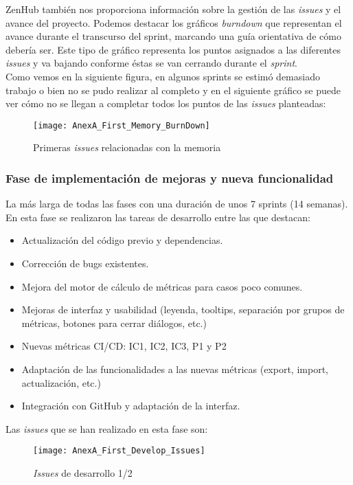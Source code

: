 ZenHub también nos proporciona información sobre la gestión de las \textit{issues} y el avance del proyecto. Podemos destacar los gráficos \textit{burndown} que representan el avance durante el transcurso del sprint, marcando una guía orientativa de cómo debería ser. Este tipo de gráfico representa los puntos asignados a las diferentes \textit{issues} y va bajando conforme éstas se van cerrando durante el \textit{sprint}. \\
Como vemos en la siguiente figura, en algunos sprints se estimó demasiado trabajo o bien no se pudo realizar al completo y en el siguiente gráfico se puede ver cómo no se llegan a completar todos los puntos de las \textit{issues} planteadas:

\begin{figure}[!h]
	\centering
	\texttt{[image: AnexA\_First\_Memory\_BurnDown]}
	\caption{Primeras \textit{issues} relacionadas con la memoria}
	\label{fig:AnexA_First_Memory_BurnDown}
\end{figure}
\FloatBarrier

\subsubsection{Fase de implementación de mejoras y nueva funcionalidad}
La más larga de todas las fases con una duración de unos 7 sprints (14 semanas). En esta fase se realizaron las tareas de desarrollo entre las que destacan:

\begin{itemize}
	\item Actualización del código previo y dependencias.
	\item Corrección de bugs existentes.
	\item Mejora del motor de cálculo de métricas para casos poco comunes.
	\item Mejoras de interfaz y usabilidad (leyenda, tooltips, separación por grupos de métricas, botones para cerrar diálogos, etc.)
	\item Nuevas métricas CI/CD: IC1, IC2, IC3, P1 y P2
	\item Adaptación de las funcionalidades a las nuevas métricas (export, import, actualización, etc.)
	\item Integración con GitHub y adaptación de la interfaz.
\end{itemize}

Las \textit{issues} que se han realizado en esta fase son:

\begin{figure}[!h]
	\centering
	\texttt{[image: AnexA\_First\_Develop\_Issues]}
	\caption{\textit{Issues} de desarrollo 1/2}
	\label{fig:AnexA_First_Develop_Issues}
\end{figure}
\FloatBarrier

